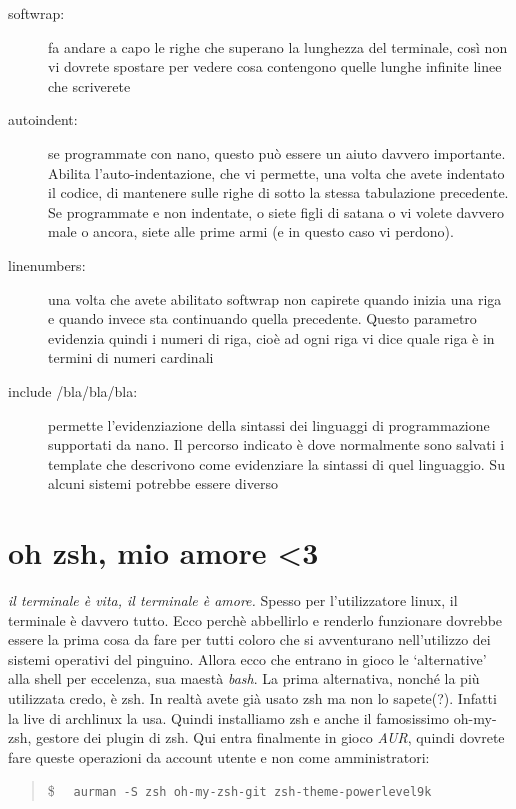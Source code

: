 \documentclass[twoside,italian]{book}
\newcommand{\shellcode}[1]{\$$\quad$ \texttt{#1}}
\newcommand{\centcode}[1]{
	\begin{quote}
		\color{code}
		\shellcode{#1}
	\end{quote}
}
\begin{document}
			\begin{description}
				
				\item[softwrap:] fa andare a capo le righe che superano la lunghezza del terminale, così non vi dovrete spostare per vedere cosa contengono quelle lunghe infinite linee che scriverete
				
				\item[autoindent:] se programmate con nano, questo può essere un aiuto davvero importante. Abilita l'auto-indentazione, che vi permette, una volta che avete indentato il codice, di mantenere sulle righe di sotto la stessa tabulazione precedente. Se programmate e non indentate, o siete figli di satana o vi volete davvero male o ancora, siete alle prime armi (e in questo caso vi perdono).
				
				\item [linenumbers:] una volta che avete abilitato softwrap non capirete quando inizia una riga e quando invece sta continuando quella precedente. Questo parametro evidenzia quindi i numeri di riga, cioè ad ogni riga vi dice quale riga è in termini di numeri cardinali
				
				\item[include /bla/bla/bla:] permette l'evidenziazione della sintassi dei linguaggi di programmazione supportati da nano. Il percorso indicato è dove normalmente sono salvati i template che descrivono come evidenziare la sintassi di quel linguaggio. Su alcuni sistemi potrebbe essere diverso
			\end{description}
		
		\section{oh zsh, mio amore <3}
			
			\textit{il terminale è vita, il terminale è amore.} Spesso per l'utilizzatore linux, il terminale è davvero tutto. Ecco perchè abbellirlo e renderlo funzionare dovrebbe essere la prima cosa da fare per tutti coloro che si avventurano nell'utilizzo dei sistemi operativi del pinguino. Allora ecco che entrano in gioco le `alternative' alla shell per eccelenza, sua maestà \textit{bash}.
			La prima alternativa, nonché la più utilizzata credo, è zsh. In realtà avete già usato zsh ma non lo sapete(?). Infatti la live di archlinux la usa.
			Quindi installiamo zsh e anche il famosissimo oh-my-zsh, gestore dei plugin di zsh.
			Qui entra finalmente in gioco \textit{AUR}, quindi dovrete fare queste operazioni da account utente e non come amministratori:
			\centcode{aurman -S zsh oh-my-zsh-git zsh-theme-powerlevel9k}
			
\end{document}
